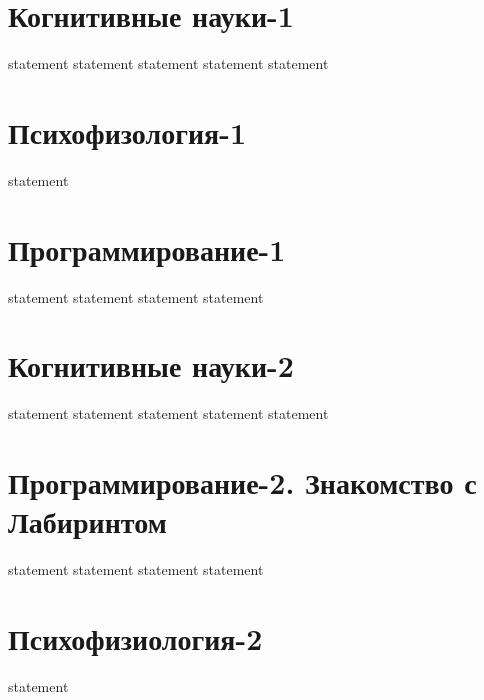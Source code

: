 \section{Когнитивные науки-1}

{statement}
{statement}
{statement}
{statement}
{statement}

\section{Психофизология-1}

{statement}

\section{Программирование-1}

{statement}
{statement}
{statement}
{statement}

\section{Когнитивные науки-2}

{statement}
{statement}
{statement}
{statement}
{statement}

\section{Программирование-2. Знакомство с Лабиринтом}

{statement}
{statement}
{statement}
{statement}

\section{Психофизиология-2}

{statement}

